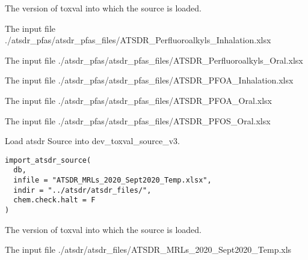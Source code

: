 \documentclass[letterpaper]{book}
\begin{document}
%
\begin{Arguments}
\begin{ldescription}
\item[\code{db}] The version of toxval into which the source is loaded.

\item[\code{infile1}] The input file ./atsdr\_pfas/atsdr\_pfas\_files/ATSDR\_Perfluoroalkyls\_Inhalation.xlsx

\item[\code{infile2}] The input file ./atsdr\_pfas/atsdr\_pfas\_files/ATSDR\_Perfluoroalkyls\_Oral.xlsx

\item[\code{infile3}] The input file ./atsdr\_pfas/atsdr\_pfas\_files/ATSDR\_PFOA\_Inhalation.xlsx

\item[\code{infile4}] The input file ./atsdr\_pfas/atsdr\_pfas\_files/ATSDR\_PFOA\_Oral.xlsx

\item[\code{infile5}] The input file ./atsdr\_pfas/atsdr\_pfas\_files/ATSDR\_PFOS\_Oral.xlsx
\end{ldescription}
\end{Arguments}
%
\begin{Description}\relax
Load atsdr Source into dev\_toxval\_source\_v3.
\end{Description}
%
\begin{Usage}
\begin{verbatim}
import_atsdr_source(
  db,
  infile = "ATSDR_MRLs_2020_Sept2020_Temp.xlsx",
  indir = "../atsdr/atsdr_files/",
  chem.check.halt = F
)
\end{verbatim}
\end{Usage}
%
\begin{Arguments}
\begin{ldescription}
\item[\code{db}] The version of toxval into which the source is loaded.

\item[\code{infile}] The input file ./atsdr/atsdr\_files/ATSDR\_MRLs\_2020\_Sept2020\_Temp.xls
\end{ldescription}
\end{Arguments}
\end{document}
